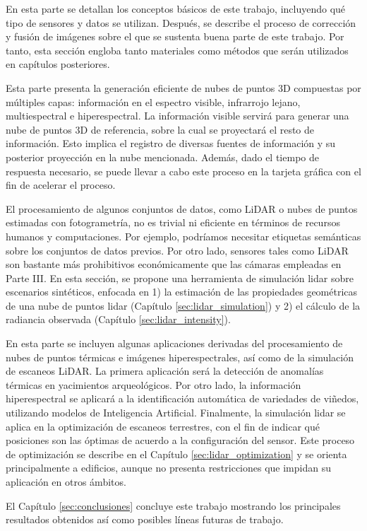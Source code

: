 \small {} \normalsize\hspace{3mm} En esta parte se detallan los conceptos básicos de este trabajo, incluyendo qué tipo de sensores y datos se utilizan. Después, se describe el proceso de corrección y fusión de imágenes sobre el que se sustenta buena parte de este trabajo. Por tanto, esta sección engloba tanto materiales como métodos que serán utilizados en capítulos posteriores.

\small {} \normalsize\hspace{3mm} Esta parte presenta la generación eficiente de nubes de puntos 3D compuestas por múltiples capas: información en el espectro visible, infrarrojo lejano, multiespectral e hiperespectral. La información visible servirá para generar una nube de puntos 3D de referencia, sobre la cual se proyectará el resto de información. Esto implica el registro de diversas fuentes de información y su posterior proyección en la nube mencionada. Además, dado el tiempo de respuesta necesario, se puede llevar a cabo este proceso en la tarjeta gráfica con el fin de acelerar el proceso. 

\small {} \normalsize\hspace{3mm} El procesamiento de algunos conjuntos de datos, como LiDAR o nubes de puntos estimadas con fotogrametría, no es trivial ni eficiente en términos de recursos humanos y computaciones. Por ejemplo, podríamos necesitar etiquetas semánticas sobre los conjuntos de datos previos. Por otro lado, sensores tales como LiDAR son bastante más prohibitivos económicamente que las cámaras empleadas en Parte III. En esta sección, se propone una herramienta de simulación \acrshort{lidar} sobre escenarios sintéticos, enfocada en 1) la estimación de las propiedades geométricas de una nube de puntos \acrshort{lidar} (Capítulo \ref{sec:lidar_simulation}) y 2) el cálculo de la radiancia observada (Capítulo \ref{sec:lidar_intensity}). 

\small {} \normalsize\hspace{3mm} En esta parte se incluyen algunas aplicaciones derivadas del procesamiento de nubes de puntos térmicas e imágenes hiperespectrales, así como de la simulación de escaneos LiDAR. La primera aplicación será la detección de anomalías térmicas en yacimientos arqueológicos. Por otro lado, la información hiperespectral se aplicará a la identificación automática de variedades de viñedos, utilizando modelos de Inteligencia Artificial. Finalmente, la simulación \acrshort{lidar} se aplica en la optimización de escaneos terrestres, con el fin de indicar qué posiciones son las óptimas de acuerdo a la configuración del sensor. Este proceso de optimización se describe en el Capítulo \ref{sec:lidar_optimization} y se orienta principalmente a edificios, aunque no presenta restricciones que impidan su aplicación en otros ámbitos.

\small {} \normalsize\hspace{3mm} El Capítulo \ref{sec:conclusiones} concluye este trabajo mostrando los principales resultados obtenidos así como posibles líneas futuras de trabajo.